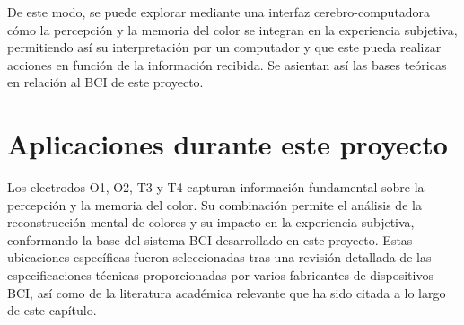 De este modo, se puede explorar mediante una interfaz cerebro-computadora cómo la percepción y la memoria del color se integran en la experiencia subjetiva, permitiendo así su interpretación por un computador y que este pueda realizar acciones en función de la información recibida. Se asientan así las bases teóricas en relación al BCI de este proyecto.

\section{Aplicaciones durante este proyecto}
Los electrodos O1, O2, T3 y T4 capturan información fundamental sobre la percepción y la memoria del color. Su combinación permite el análisis de la reconstrucción mental de colores y su impacto en la experiencia subjetiva, conformando la base del sistema BCI desarrollado en este proyecto. Estas ubicaciones específicas fueron seleccionadas tras una revisión detallada de las especificaciones técnicas proporcionadas por varios fabricantes de dispositivos BCI, así como de la literatura académica relevante que ha sido citada a lo largo de este capítulo.
